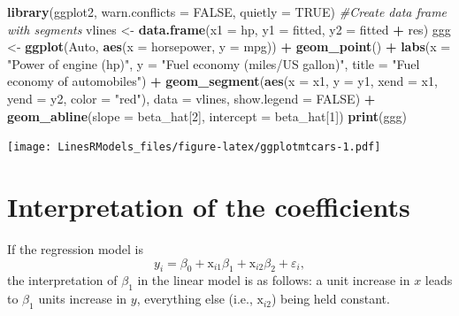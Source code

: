 \documentclass[]{book}
\newenvironment{Shaded}{\begin{snugshade}}{\end{snugshade}}
\newcommand{\KeywordTok}[1]{\textcolor[rgb]{0.13,0.29,0.53}{\textbf{#1}}}
\newcommand{\DataTypeTok}[1]{\textcolor[rgb]{0.13,0.29,0.53}{#1}}
\newcommand{\DecValTok}[1]{\textcolor[rgb]{0.00,0.00,0.81}{#1}}
\newcommand{\StringTok}[1]{\textcolor[rgb]{0.31,0.60,0.02}{#1}}
\newcommand{\CommentTok}[1]{\textcolor[rgb]{0.56,0.35,0.01}{\textit{#1}}}
\newcommand{\OtherTok}[1]{\textcolor[rgb]{0.56,0.35,0.01}{#1}}
\newcommand{\OperatorTok}[1]{\textcolor[rgb]{0.81,0.36,0.00}{\textbf{#1}}}
\newcommand{\NormalTok}[1]{#1}
\theoremstyle{definition}
\theoremstyle{definition}
\theoremstyle{definition}
\theoremstyle{remark}
\begin{document}
\begin{Shaded}
\begin{Highlighting}[]
\KeywordTok{library}\NormalTok{(ggplot2, }\DataTypeTok{warn.conflicts =} \OtherTok{FALSE}\NormalTok{, }\DataTypeTok{quietly =} \OtherTok{TRUE}\NormalTok{)}
\CommentTok{#Create data frame with segments}
\NormalTok{vlines <-}\StringTok{ }\KeywordTok{data.frame}\NormalTok{(}\DataTypeTok{x1 =}\NormalTok{ hp, }\DataTypeTok{y1 =}\NormalTok{ fitted, }\DataTypeTok{y2 =}\NormalTok{ fitted }\OperatorTok{+}\StringTok{ }\NormalTok{res)}
\NormalTok{ggg <-}\StringTok{ }\KeywordTok{ggplot}\NormalTok{(Auto, }\KeywordTok{aes}\NormalTok{(}\DataTypeTok{x =}\NormalTok{ horsepower, }\DataTypeTok{y =}\NormalTok{ mpg)) }\OperatorTok{+}\StringTok{ }
\StringTok{        }\KeywordTok{geom_point}\NormalTok{() }\OperatorTok{+}\StringTok{ }
\StringTok{        }\KeywordTok{labs}\NormalTok{(}\DataTypeTok{x =} \StringTok{"Power of engine (hp)"}\NormalTok{, }
             \DataTypeTok{y =} \StringTok{"Fuel economy (miles/US gallon)"}\NormalTok{, }
             \DataTypeTok{title =} \StringTok{"Fuel economy of automobiles"}\NormalTok{) }\OperatorTok{+}
\StringTok{      }\KeywordTok{geom_segment}\NormalTok{(}\KeywordTok{aes}\NormalTok{(}\DataTypeTok{x =}\NormalTok{ x1, }\DataTypeTok{y =}\NormalTok{ y1, }\DataTypeTok{xend =}\NormalTok{ x1, }\DataTypeTok{yend =}\NormalTok{ y2, }\DataTypeTok{color =} \StringTok{"red"}\NormalTok{), }
                   \DataTypeTok{data =}\NormalTok{ vlines, }\DataTypeTok{show.legend =} \OtherTok{FALSE}\NormalTok{) }\OperatorTok{+}\StringTok{ }
\StringTok{      }\KeywordTok{geom_abline}\NormalTok{(}\DataTypeTok{slope =}\NormalTok{ beta_hat[}\DecValTok{2}\NormalTok{], }\DataTypeTok{intercept =}\NormalTok{ beta_hat[}\DecValTok{1}\NormalTok{])}
\KeywordTok{print}\NormalTok{(ggg)}
\end{Highlighting}
\end{Shaded}

\texttt{[image: LinesRModels\_files/figure-latex/ggplotmtcars-1.pdf]}

\section{Interpretation of the
coefficients}\label{interpretation-of-the-coefficients}

If the regression model is
\[y_i = \beta_0 + \mathrm{x}_{i1}\beta_1 + \mathrm{x}_{i2}\beta_2 + \varepsilon_i,\]
the interpretation of \(\beta_1\) in the linear model is as follows: a
unit increase in \(x\) leads to \(\beta_1\) units increase in \(y\),
everything else (i.e., \(\mathrm{x}_{i2}\)) being held constant.
\end{document}
